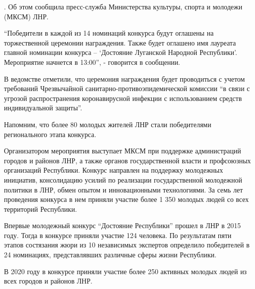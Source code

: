 \begin{multicols}{2}

. Об этом сообщила
пресс-служба Министерства культуры, спорта и молодежи (МКСМ) ЛНР.

\enquote{Победители в каждой из 14 номинаций конкурса будут оглашены на торжественной
церемонии награждения. Также будет оглашено имя лауреата главной номинации
конкурса – \enquote{Достояние Луганской Народной Республики}. Мероприятие начнется в
13:00}, - говорится в сообщении.

В ведомстве отметили, что церемония награждения будет проводиться с учетом
требований Чрезвычайной санитарно-противоэпидемической комиссии \enquote{в связи с
угрозой распространения коронавирусной инфекции с использованием средств
индивидуальной защиты}.

Напомним, что более 80 молодых жителей ЛНР стали победителями регионального
этапа конкурса.

Организатором мероприятия выступает МКСМ при поддержке администраций городов и
районов ЛНР, а также органов государственной власти и профсоюзных организаций
Республики. Конкурс направлен на поддержку молодежных инициатив, консолидацию
усилий по реализации государственной молодежной политики в ЛНР, обмен опытом и
инновационными технологиями. За семь лет проведения конкурса в нем приняли
участие более 1 350 молодых людей со всех территорий Республики.

Впервые молодежный конкурс \enquote{Достояние Республики} прошел в ЛНР в 2015 году.
Тогда в конкурсе приняли участие 124 человека. По результатам пяти этапов
состязания жюри из 10 независимых экспертов определило победителей в 24
номинациях, представлявших различные сферы жизни Республики.

В 2020 году в конкурсе приняли участие более 250 активных молодых людей из всех
городов и районов ЛНР.
\end{multicols}
